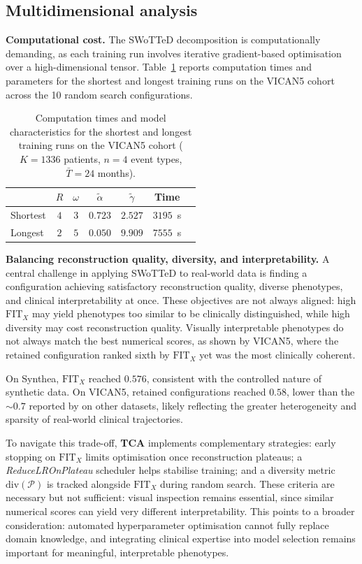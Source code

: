 \documentclass[a4paper]{cas-sc}
\newcommand{\pkg}[1]{\textbf{#1}}
\begin{document}
\subsection{Multidimensional analysis}\label{sec:disc_multi}

\textbf{Computational cost.}
The SWoTTeD decomposition is computationally demanding, as each training run involves iterative gradient-based optimisation over a high-dimensional tensor. 
Table~\ref{tab:compute_vican5} reports computation times and parameters for the shortest and longest training runs on the VICAN5 cohort across the 10 random search configurations. 

\begin{table}[htbp]
\centering
\caption{Computation times and model characteristics for the shortest and longest training runs on the VICAN5 cohort ($K=1 336$ patients, $n=4$ event types, $\bar{T}=24$ months).}
\label{tab:compute_vican5}
\begin{tabular}{lcccccc}
\toprule
 & $R$ & $\omega$ & $\tilde{\alpha}$ & $\tilde{\gamma}$ & Time \\
\midrule
Shortest & $4$ & $3$ & $0.723$ & $2.527$ & $3 195$~s \\
Longest  & $2$ & $5$ & $0.050$ & $9.909$ & $7 555$~s \\
\bottomrule
\end{tabular}
\end{table}

\textbf{Balancing reconstruction quality, diversity, and interpretability.}
A central challenge in applying SWoTTeD to real-world data is finding a configuration achieving satisfactory reconstruction quality, diverse phenotypes, and clinical interpretability at once. 
These objectives are not always aligned: high $\text{FIT}_X$ may yield phenotypes too similar to be clinically distinguished, while high diversity may cost reconstruction quality. 
Visually interpretable phenotypes do not always match the best numerical scores, as shown by VICAN5, where the retained configuration ranked sixth by $\text{FIT}_X$ yet was the most clinically coherent.
 
On Synthea, $\text{FIT}_X$ reached $0.576$, consistent with the controlled nature of synthetic data. 
On VICAN5, retained configurations reached $0.58$, lower than the $\sim\!0.7$ reported by \cite{sebia2024swotted} on other datasets, likely reflecting the greater heterogeneity and sparsity of real-world clinical trajectories.
 
To navigate this trade-off, \pkg{TCA} implements complementary strategies: early stopping on $\text{FIT}_X$ limits optimisation once reconstruction plateaus; a \emph{ReduceLROnPlateau} scheduler helps stabilise training; and a diversity metric $\text{div}(\mathcal{P})$ is tracked alongside $\text{FIT}_X$ during random search. 
These criteria are necessary but not sufficient: visual inspection remains essential, since similar numerical scores can yield very different interpretability. 
This points to a broader consideration: automated hyperparameter optimisation cannot fully replace domain knowledge, and integrating clinical expertise into model selection remains important for meaningful, interpretable phenotypes.
\end{document}
